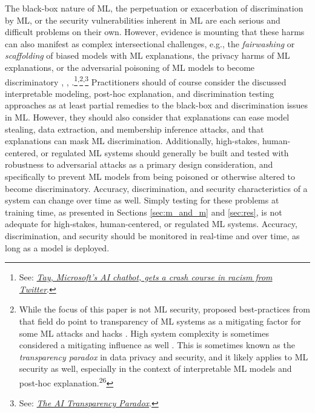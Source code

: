 \documentclass[information,article,submit,moreauthors,pdftex]{definitions/mdpi}
\begin{document}
The black-box nature of ML, the perpetuation or exacerbation of discrimination by ML, or the security vulnerabilities inherent in ML are each serious and difficult problems on their own. However, evidence is mounting that these harms can also manifest as complex intersectional challenges, e.g., the \textit{fairwashing} or \textit{scaffolding} of biased models with ML explanations, the privacy harms of ML explanations, or the adversarial poisoning of ML models to become discriminatory \cite{shokri2019privacy}, \cite{fair_washing}, \cite{scaffolding}.\footnote{See: \href{https://www.theguardian.com/technology/2016/mar/24/tay-microsofts-ai-chatbot-gets-a-crash-course-in-racism-from-twitter}{\textit{Tay, Microsoft's AI chatbot, gets a crash course in racism from Twitter}}.}\textsuperscript{,}\footnote{While the focus of this paper is not ML security, proposed best-practices from that field do point to transparency of ML systems as a mitigating factor for some ML attacks and hacks \cite{papernot2018marauder}. High system complexity is sometimes considered a mitigating influence as well \cite{hoare19811980}. This is sometimes known as the \textit{transparency paradox} in data privacy and security, and it likely applies to ML security as well, especially in the context of interpretable ML models and post-hoc explanation.\textsuperscript{26}}\textsuperscript{,}\footnote{See: \href{https://hbr.org/2019/12/the-ai-transparency-paradox}{\textit{The AI Transparency Paradox}}.} Practitioners should of course consider the discussed interpretable modeling, post-hoc explanation, and discrimination testing approaches as at least partial remedies to the black-box and discrimination issues in ML. However, they should also consider that explanations can ease model stealing, data extraction, and membership inference attacks, and that explanations can mask ML discrimination. Additionally, high-stakes, human-centered, or regulated ML systems should generally be built and tested with robustness to adversarial attacks as a primary design consideration, and specifically to prevent ML models from being poisoned or otherwise altered to become discriminatory. Accuracy, discrimination, and security characteristics of a system can change over time as well. Simply testing for these problems at training time, as presented in Sections \ref{sec:m_and_m} and \ref{sec:res}, is not adequate for high-stakes, human-centered, or regulated ML systems. Accuracy, discrimination, and security should be monitored in real-time and over time, as long as a model is deployed.
\end{document}
